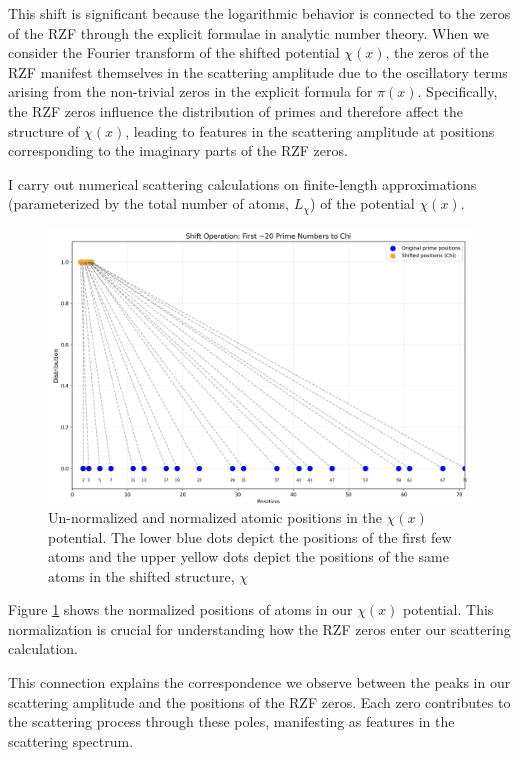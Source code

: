 \documentclass[11pt, oneside]{article}
\begin{document}
This shift is significant because the logarithmic behavior is connected to the zeros of the RZF through the explicit formulae in analytic number theory. When we consider the Fourier transform of the shifted potential $\chi(x)$, the zeros of the RZF manifest themselves in the scattering amplitude due to the oscillatory terms arising from the non-trivial zeros in the explicit formula for $\pi(x)$. Specifically, the RZF zeros influence the distribution of primes and therefore affect the structure of $\chi(x)$, leading to features in the scattering amplitude at positions corresponding to the imaginary parts of the RZF zeros.

I carry out numerical scattering calculations on finite-length approximations (parameterized by the total number of atoms, $L_{\chi}$) of the potential $\chi(x)$.

\begin{figure}[htbp]
\begin{center}
    \includegraphics[width=0.8\linewidth]{normalizing.png}
\caption{Un-normalized and normalized atomic positions in the $\chi(x)$ potential. The lower blue dots depict the positions of the first few atoms and the upper yellow dots depict the positions of the same atoms in the shifted structure, $\chi$}
\label{fig:normalized_positions}
\end{center}
\end{figure}

Figure \ref{fig:normalized_positions} shows the normalized positions of atoms in our $\chi(x)$ potential. This normalization is crucial for understanding how the RZF zeros enter our scattering calculation.

This connection explains the correspondence we observe between the peaks in our scattering amplitude and the positions of the RZF zeros. Each zero contributes to the scattering process through these poles, manifesting as features in the scattering spectrum.
\end{document}
